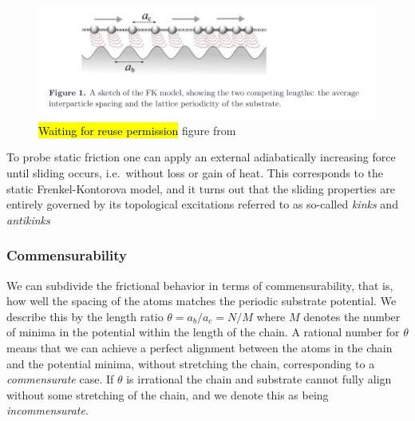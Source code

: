 \begin{figure}[H]
  \centering
  \includegraphics[width=0.8\linewidth]{figures/theory/FK_model.png}
  \caption{\hl{Waiting for reuse permission} figure from~\cite{Manini_2016}}
  \label{fig:FK_model}
\end{figure}

To probe static friction one can apply an external adiabatically increasing force until sliding occurs, i.e.\ without loss or gain of heat. This corresponds to the static Frenkel-Kontorova model, and it turns out that the sliding properties are entirely governed by its topological excitations referred to as so-called \textit{kinks} and \textit{antikinks}

\subsubsection{Commensurability} We can subdivide the frictional behavior in terms of commensurability, that is, how well the spacing of the atoms matches the periodic substrate potential. We describe this by the length ratio $\theta = a_b / a_c = N / M$ where $M$ denotes the number of minima in the potential within the length of the chain. A rational number for $\theta$ means that we can achieve a perfect alignment between the atoms in the chain and the potential minima, without stretching the chain, corresponding to a \textit{commensurate} case. If $\theta$ is irrational the chain and substrate cannot fully align without some stretching of the chain, and we denote this as being \textit{incommensurate}.

